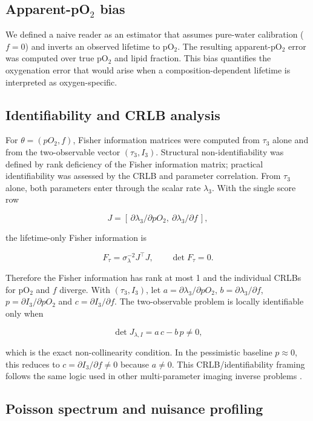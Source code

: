 \documentclass[pdflatex,sn-mathphys-num]{sn-jnl}
\begin{document}
\subsection[Apparent-pO2 bias]{\texorpdfstring{Apparent-pO$_2$ bias}{Apparent-pO2 bias}}\label{apparent-po_2-bias}

We defined a naive reader as an estimator that assumes pure-water calibration (\(f=0\)) and inverts an observed lifetime to pO\(_2\). The resulting apparent-pO\(_2\) error was computed over true pO\(_2\) and lipid fraction. This bias quantifies the oxygenation error that would arise when a composition-dependent lifetime is interpreted as oxygen-specific.

\subsection{Identifiability and CRLB analysis}\label{identifiability-and-crlb-analysis}

For \(\theta=(pO_2,f)\), Fisher information matrices were computed from \(\tau_3\) alone and from the two-observable vector \((\tau_3,I_3)\). Structural non-identifiability was defined by rank deficiency of the Fisher information matrix; practical identifiability was assessed by the CRLB and parameter correlation. From \(\tau_3\) alone, both parameters enter through the scalar rate \(\lambda_3\). With the single score row

\[J=[\,\partial\lambda_3/\partial pO_2,\ \partial\lambda_3/\partial f\,],\]

the lifetime-only Fisher information is

\[F_\tau=\sigma_\lambda^{-2}J^\top J,\qquad \det F_\tau=0.\]

Therefore the Fisher information has rank at most 1 and the individual CRLBs for pO\(_2\) and \(f\) diverge. With \((\tau_3,I_3)\), let \(a=\partial\lambda_3/\partial pO_2\), \(b=\partial\lambda_3/\partial f\), \(p=\partial I_3/\partial pO_2\) and \(c=\partial I_3/\partial f\). The two-observable problem is locally identifiable only when

\[\det J_{\lambda,I}=a\,c-b\,p\neq0,\]

which is the exact non-collinearity condition. In the pessimistic baseline \(p\approx0\), this reduces to \(c=\partial I_3/\partial f\neq0\) because \(a\neq0\). This CRLB/identifiability framing follows the same logic used in other multi-parameter imaging inverse problems \cite{ref19}.

\subsection{Poisson spectrum and nuisance profiling}\label{poisson-spectrum-and-nuisance-profiling}
\end{document}
